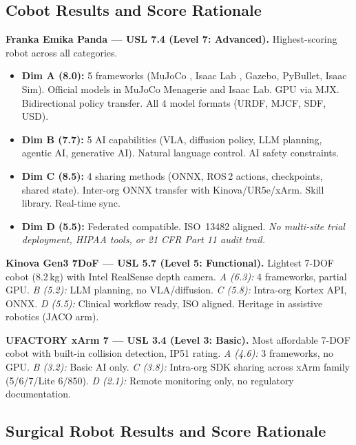 \subsection{Cobot Results and Score Rationale}

\textbf{Franka Emika Panda --- USL 7.4 (Level 7: Advanced).} Highest-scoring robot across all categories.
\begin{itemize}
  \item \textbf{Dim A (8.0):} 5 frameworks (MuJoCo \cite{mujoco2024}, Isaac Lab \cite{isaaclab2024}, Gazebo, PyBullet, Isaac Sim). Official models in MuJoCo Menagerie \cite{menagerie2024} and Isaac Lab. GPU via MJX. Bidirectional policy transfer. All 4 model formats (URDF, MJCF, SDF, USD).
  \item \textbf{Dim B (7.7):} 5 AI capabilities (VLA, diffusion policy, LLM planning, agentic AI, generative AI). Natural language control. AI safety constraints.
  \item \textbf{Dim C (8.5):} 4 sharing methods (ONNX, ROS\,2 actions, checkpoints, shared state). Inter-org ONNX transfer with Kinova/UR5e/xArm. Skill library. Real-time sync.
  \item \textbf{Dim D (5.5):} Federated compatible. ISO~13482 aligned. \emph{No multi-site trial deployment, HIPAA tools, or 21 CFR Part 11 audit trail.}
\end{itemize}

\textbf{Kinova Gen3 7DoF --- USL 5.7 (Level 5: Functional).} Lightest 7-DOF cobot (8.2\,kg) with Intel RealSense depth camera. \textit{A (6.3):} 4 frameworks, partial GPU. \textit{B (5.2):} LLM planning, no VLA/diffusion. \textit{C (5.8):} Intra-org Kortex API, ONNX. \textit{D (5.5):} Clinical workflow ready, ISO aligned. Heritage in assistive robotics (JACO arm).

\textbf{UFACTORY xArm 7 --- USL 3.4 (Level 3: Basic).} Most affordable 7-DOF cobot with built-in collision detection, IP51 rating. \textit{A (4.6):} 3 frameworks, no GPU. \textit{B (3.2):} Basic AI only. \textit{C (3.8):} Intra-org SDK sharing across xArm family (5/6/7/Lite 6/850). \textit{D (2.1):} Remote monitoring only, no regulatory documentation.

\subsection{Surgical Robot Results and Score Rationale}

